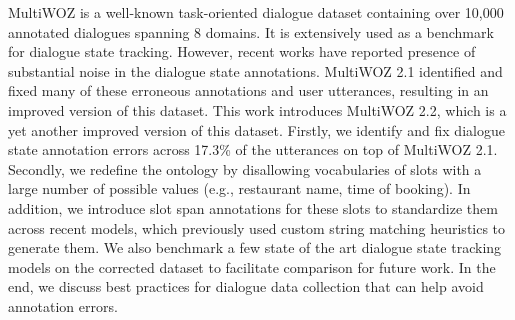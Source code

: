 MultiWOZ is a well-known task-oriented dialogue dataset containing over 10,000 annotated dialogues spanning 8 domains. It is extensively used as a benchmark for dialogue state tracking. However, recent works have reported presence of substantial noise in the dialogue state annotations. MultiWOZ 2.1 identified and fixed many of these erroneous annotations and user utterances, resulting in an improved version of this dataset. This work introduces MultiWOZ 2.2, which is a yet another improved version of this dataset. Firstly, we identify and fix dialogue state annotation errors across 17.3\% of the utterances on top of MultiWOZ 2.1. Secondly, we redefine the ontology by disallowing vocabularies of slots with a large number of possible values (e.g., restaurant name, time of booking). In addition, we introduce slot span annotations for these slots to standardize them across recent models, which previously used custom string matching heuristics to generate them. We also benchmark a few state of the art dialogue state tracking models on the corrected dataset to facilitate comparison for future work. In the end, we discuss best practices for dialogue data collection that can help avoid annotation errors.
